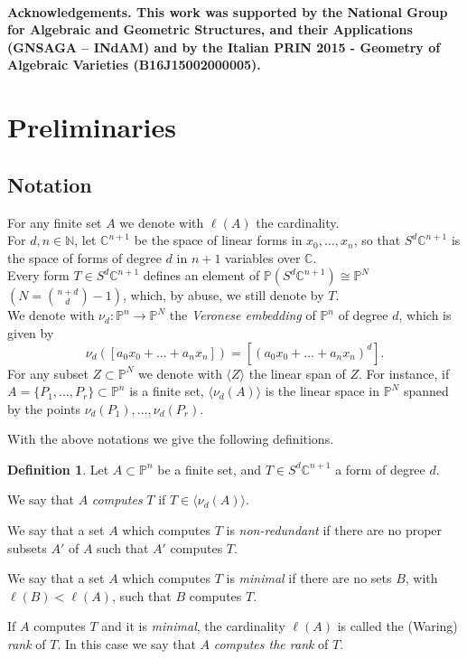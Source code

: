 \documentclass{amsart}
\newcommand{\C}{\mathbb{C}}
\newcommand{\Pj}{\mathbb{P}}
\newcommand{\N}{\mathbb{N}}
\theoremstyle{definition}
\newtheorem{defn0}[thm0]{Definition}
\begin{document}
\paragraph{\textbf{Acknowledgements.} This work was supported by the National Group for Algebraic and Geometric Structures, 
and their Applications (GNSAGA – INdAM) and by the Italian PRIN 2015 - Geometry of Algebraic Varieties (B16J15002000005).}


\section{Preliminaries}\label{sec:notation}

\subsection{Notation}
For any finite set $A$ we denote with $\ell(A)$ the cardinality.\\
For $d,n \in \N$, let $ \C^{n+1} $ be the space of linear forms in $ x_{0}, \ldots, x_{n} $, so that $ S^{d} \C^{n+1}$ 
is the space of forms of degree $d$ in $n+1$ variables over $\C$. \\
Every form $ T \in S^{d} \C^{n+1} $ defines an element of $ \Pj(S^{d} \C^{n+1}) \cong \Pj^{N} $ $( N = \binom{n+d}{d} - 1) $, which, by abuse, we still denote by $T$. \\
We denote with $ \nu_{d}: \Pj^{n} \rightarrow \Pj^{N} $ the \emph{Veronese embedding} of $ \Pj^{n} $ of degree $ d $, which is given by 
$$ \nu_{d}([a_{0}x_{0}+ \ldots + a_{n}x_{n}]) = [(a_{0}x_{0}+ \ldots + a_{n}x_{n})^{d}]. $$ 
For any subset $Z\subset \Pj^N$ we denote with $\langle Z\rangle$ the linear span of $Z$. For instance, if $ A = \{P_{1}, \ldots, P_r\} \subset \Pj^{n} $ is a finite set,
$ \langle \nu_{d}(A) \rangle $ is the linear space in $\Pj^N$ spanned by the points $ \nu_{d}(P_{1}), \ldots, \nu_{d}(P_{r}) $. 
\smallskip

With the above notations we give the following definitions.

\begin{defn0}
Let $ A \subset \Pj^n $ be a finite set, and $ T \in S^{d} \C^{n+1} $ a form of degree $d$. 

We say that $ A $ \emph{computes} $ T $ if $ T\in \langle \nu_{d}(A) \rangle$.

We say that a set $ A $ which computes $T$ is \emph{non-redundant} if there are no proper subsets $ A' $ of $ A $ 
such that $A'$ computes $T$.

We say that a set $ A $ which computes $T$ is \emph{minimal} if there are no sets $B$, with $\ell(B)<\ell(A)$, 
such that $B$ computes $T$.

If $A$ computes $T$ and it is \emph{minimal}, the cardinality $\ell(A)$ is called the (Waring) \emph{rank} of $T$.
In this case we say that $A$ \emph{computes the rank} of $T$.
\end{defn0}
\end{document}
